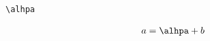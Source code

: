 \documentclass{article}
\begin{document}
\begin{verbatim}
\alhpa
\end{verbatim}
\begin{align*}
a&=\alhpa+b
\end{align*}
\end{document}
